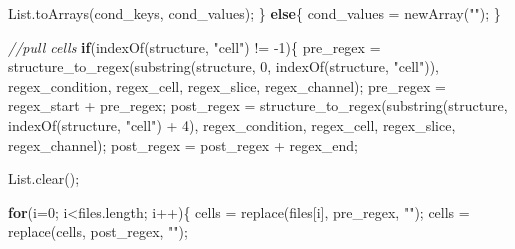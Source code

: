 \documentclass[
  12pt,
  a4paper,
]{book}
\newenvironment{Shaded}{}{}
\newcommand{\CommentTok}[1]{\textcolor[rgb]{0.38,0.63,0.69}{\textit{#1}}}
\newcommand{\ControlFlowTok}[1]{\textcolor[rgb]{0.00,0.44,0.13}{\textbf{#1}}}
\newcommand{\DecValTok}[1]{\textcolor[rgb]{0.25,0.63,0.44}{#1}}
\newcommand{\NormalTok}[1]{#1}
\newcommand{\OperatorTok}[1]{\textcolor[rgb]{0.40,0.40,0.40}{#1}}
\newcommand{\StringTok}[1]{\textcolor[rgb]{0.25,0.44,0.63}{#1}}
\begin{document}
\begin{Shaded}
\begin{Highlighting}[]
\NormalTok{    List}\OperatorTok{.}\NormalTok{toArrays}\OperatorTok{(}\NormalTok{cond\_keys}\OperatorTok{,}\NormalTok{ cond\_values}\OperatorTok{);}
\OperatorTok{\}}
\ControlFlowTok{else}\OperatorTok{\{}
\NormalTok{    cond\_values }\OperatorTok{=}\NormalTok{ newArray}\OperatorTok{(}\StringTok{""}\OperatorTok{);}
\OperatorTok{\}}

\CommentTok{//pull cells}
\ControlFlowTok{if}\OperatorTok{(}\NormalTok{indexOf}\OperatorTok{(}\NormalTok{structure}\OperatorTok{,} \StringTok{"cell"}\OperatorTok{)} \OperatorTok{!=} \OperatorTok{{-}}\DecValTok{1}\OperatorTok{)\{}
\NormalTok{    pre\_regex }\OperatorTok{=}\NormalTok{ structure\_to\_regex}\OperatorTok{(}\NormalTok{substring}\OperatorTok{(}\NormalTok{structure}\OperatorTok{,} \DecValTok{0}\OperatorTok{,}\NormalTok{ indexOf}\OperatorTok{(}\NormalTok{structure}\OperatorTok{,} \StringTok{"cell"}\OperatorTok{)),}\NormalTok{ regex\_condition}\OperatorTok{,}\NormalTok{ regex\_cell}\OperatorTok{,}\NormalTok{ regex\_slice}\OperatorTok{,}\NormalTok{ regex\_channel}\OperatorTok{);}
\NormalTok{    pre\_regex }\OperatorTok{=}\NormalTok{ regex\_start }\OperatorTok{+}\NormalTok{ pre\_regex}\OperatorTok{;}
\NormalTok{    post\_regex }\OperatorTok{=}\NormalTok{ structure\_to\_regex}\OperatorTok{(}\NormalTok{substring}\OperatorTok{(}\NormalTok{structure}\OperatorTok{,}\NormalTok{ indexOf}\OperatorTok{(}\NormalTok{structure}\OperatorTok{,} \StringTok{"cell"}\OperatorTok{)} \OperatorTok{+} \DecValTok{4}\OperatorTok{),}\NormalTok{ regex\_condition}\OperatorTok{,}\NormalTok{ regex\_cell}\OperatorTok{,}\NormalTok{ regex\_slice}\OperatorTok{,}\NormalTok{ regex\_channel}\OperatorTok{);}
\NormalTok{    post\_regex }\OperatorTok{=}\NormalTok{ post\_regex }\OperatorTok{+}\NormalTok{ regex\_end}\OperatorTok{;}
    
\NormalTok{    List}\OperatorTok{.}\NormalTok{clear}\OperatorTok{();}
    
    \ControlFlowTok{for}\OperatorTok{(}\NormalTok{i}\OperatorTok{=}\DecValTok{0}\OperatorTok{;}\NormalTok{ i}\OperatorTok{\textless{}}\NormalTok{files}\OperatorTok{.}\NormalTok{length}\OperatorTok{;}\NormalTok{ i}\OperatorTok{++)\{}
\NormalTok{        cells }\OperatorTok{=}\NormalTok{ replace}\OperatorTok{(}\NormalTok{files}\OperatorTok{[}\NormalTok{i}\OperatorTok{],}\NormalTok{ pre\_regex}\OperatorTok{,} \StringTok{""}\OperatorTok{);}
\NormalTok{        cells }\OperatorTok{=}\NormalTok{ replace}\OperatorTok{(}\NormalTok{cells}\OperatorTok{,}\NormalTok{ post\_regex}\OperatorTok{,} \StringTok{""}\OperatorTok{);}
        

\end{Highlighting}
\end{Shaded}
\end{document}
